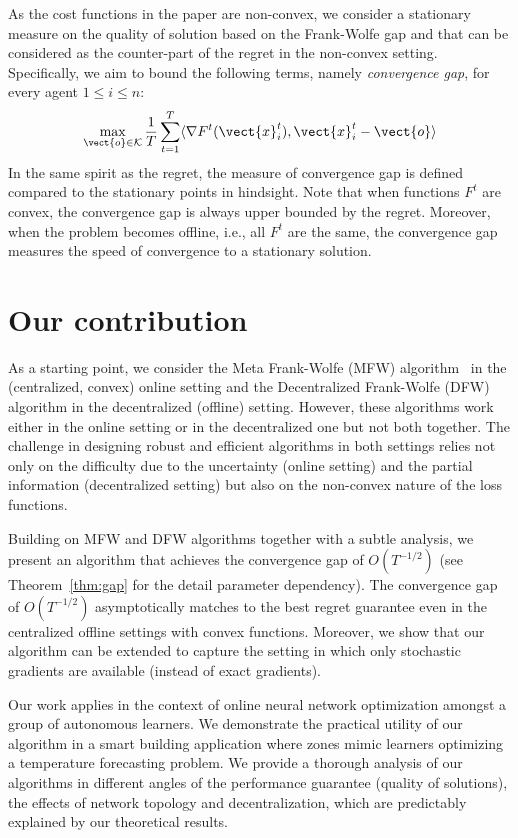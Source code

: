 As the cost functions in the paper are non-convex, we consider a stationary measure on the quality of 
solution based on the Frank-Wolfe gap \cite{Jaggi:2013,lacostejulien:2016} and that can be considered as the counter-part of the regret in 
the non-convex setting. Specifically, we aim to bound the following terms, namely \emph{convergence gap}, for every agent $1 \leq i \leq n$:
% 
\begin{align}	\label{eq:gap_def}
    \max_{\vect{o} \in \mathcal{K}} \frac{1}{T} \sum_{t=1}^{T} \langle \nabla F^{t}(\vect{x}^{t}_{i}), \vect{x}^{t}_{i} - \vect{o}\rangle 
    \end{align}
% 
In the same spirit as the regret, the measure of convergence gap is defined compared to the stationary points in hindsight. 
Note that when functions $F^{t}$ are convex, the convergence gap is always upper bounded by the regret. 
Moreover, when the problem becomes offline, i.e., all $F^{t}$ are the same, the convergence gap measures the speed of convergence to a stationary solution.

\section{Our contribution}

As a starting point, we consider the Meta Frank-Wolfe (MFW) algorithm~\cite{ChenHassani18:Online-continuous} in the (centralized, convex) online setting and the Decentralized Frank-Wolfe (DFW) algorithm \cite{WaiLafond17:Decentralized-Frank--Wolfe} in the decentralized (offline) setting. However, these algorithms work either in the online setting or in the decentralized one but not both together. The challenge in designing robust and efficient algorithms in both settings relies not only on the difficulty due to the uncertainty (online setting) and the partial information (decentralized setting) but also on the non-convex nature of the loss functions. 

Building on MFW and DFW algorithms together with a subtle analysis, 
we present an algorithm that achieves the convergence gap of $O(T^{-1/2})$ (see Theorem~\ref{thm:gap} for the detail parameter dependency). 
The convergence gap of $O(T^{-1/2})$ asymptotically matches to the best regret guarantee even in the centralized offline settings with convex functions. Moreover, we show that our algorithm can be extended to capture the setting in which only stochastic gradients are available (instead of exact gradients). 

Our work applies in the context of online neural network optimization amongst a group of autonomous learners.
We demonstrate the practical utility of our algorithm in a smart building application where zones mimic learners optimizing a temperature forecasting problem.
We provide a thorough analysis of our algorithms in different angles of the performance guarantee (quality of solutions), the effects of network topology and decentralization, which are predictably explained by our theoretical results.

